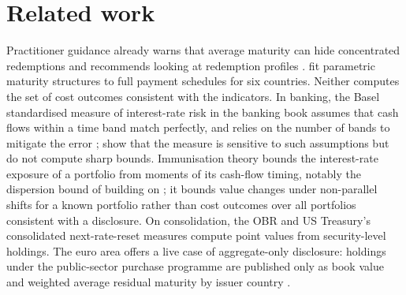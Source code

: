 \documentclass[11pt,a4paper]{article}
\theoremstyle{remark}
\begin{document}
\begin{table}[t]\centering\small
\caption{OBR debt-interest ready reckoner (March 2026, fiscal years 2026-27 to 2030-31, read from the published workbook) and the legacy-stock values of this paper (12-month windows from 13 October 2026), £ billion.}\label{tab:obr}
\resizebox{\textwidth}{!}{}
\end{table}



\section{Related work}\label{sec:lit}

Practitioner guidance already warns that average maturity can hide concentrated redemptions and recommends looking at redemption profiles \citep{IMFWB2014,JonassonPapaioannou2018}. \citet{BarrettJohns2024} fit parametric maturity structures to full payment schedules for six countries. Neither computes the set of cost outcomes consistent with the indicators. In banking, the Basel standardised measure of interest-rate risk in the banking book assumes that cash flows within a time band match perfectly, and relies on the number of bands to mitigate the error \citep{BCBS2019}; \citet{EntropWilkensZeisler2009} show that the measure is sensitive to such assumptions but do not compute sharp bounds. Immunisation theory bounds the interest-rate exposure of a portfolio from moments of its cash-flow timing, notably the dispersion bound of \citet{FongVasicek1984} building on \citet{Redington1952}; it bounds value changes under non-parallel shifts for a known portfolio rather than cost outcomes over all portfolios consistent with a disclosure. On consolidation, the OBR \citep{OBR2021box} and US Treasury's consolidated next-rate-reset measures \citep{TBAC2026} compute point values from security-level holdings. The euro area offers a live case of aggregate-only disclosure: holdings under the public-sector purchase programme are published only as book value and weighted average residual maturity by issuer country \citep{ECB2020}.
\end{document}
